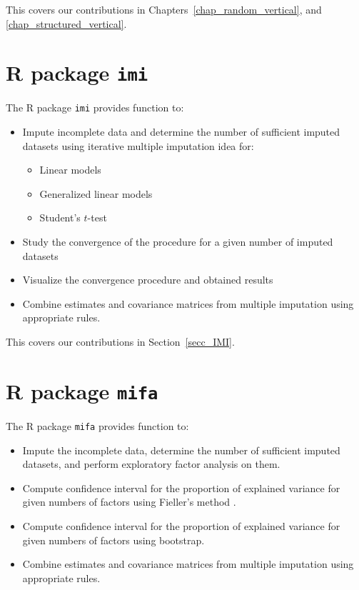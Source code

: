 \documentclass[11pt,a5paper,twoside]{book}
\begin{document}
This covers our contributions in Chapters~\ref{chap_random_vertical}, and \ref{chap_structured_vertical}.


\section{R package {\tt{imi}}}
The R package {\tt{imi}} provides function to:

\begin{itemize}
\item Impute incomplete data and determine the number of sufficient imputed datasets using iterative multiple imputation idea for:
\vspace{-\topsep}
\begin{itemize}
\item Linear models
\item Generalized linear models
\item Student's $t$-test
\end{itemize}
\vspace{-\topsep}
\item Study the convergence of the procedure for a given number of imputed datasets
\item Visualize the convergence procedure and obtained results
\item Combine estimates and covariance matrices from multiple imputation using appropriate rules.
\end{itemize}

This covers our contributions in Section~\ref{secc_IMI}.



\section{R package {\tt{mifa}}}


The R package {\tt{mifa}} provides function to:

\begin{itemize}
\item Impute the incomplete data, determine the number of sufficient imputed datasets, and perform exploratory factor analysis on them.
\item Compute confidence interval for the proportion of explained variance for given numbers of factors using Fieller's method \citep{fieller1954}.
\item Compute confidence interval for the proportion of explained variance for given numbers of factors using bootstrap.
\item Combine estimates and covariance matrices from multiple imputation using appropriate rules.
\end{itemize}
\end{document}
